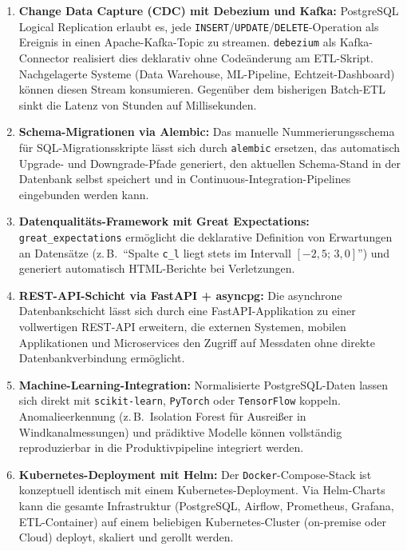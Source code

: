 \documentclass[12pt,a4paper]{report}
\theoremstyle{definition}
\theoremstyle{remark}
\newcommand{\docker}{\texttt{Docker}}
\newcommand{\code}[1]{\texttt{#1}}
\begin{document}
\begin{enumerate}[leftmargin=1.5em, itemsep=4pt]
  \item \textbf{Change Data Capture (CDC) mit Debezium und Kafka:}
        PostgreSQL Logical Replication erlaubt es, jede
        \code{INSERT}/\code{UPDATE}/\code{DELETE}-Operation als Ereignis
        in einen Apache-Kafka-Topic zu streamen. \code{debezium} als
        Kafka-Connector realisiert dies deklarativ ohne Codeänderung
        am ETL-Skript. Nachgelagerte Systeme (Data Warehouse,
        ML-Pipeline, Echtzeit-Dashboard) können diesen Stream
        konsumieren. Gegenüber dem bisherigen Batch-ETL sinkt die
        Latenz von Stunden auf Millisekunden.

  \item \textbf{Schema-Migrationen via Alembic:}
        Das manuelle Nummerierungsschema für SQL-Migrationsskripte
        lässt sich durch \code{alembic} ersetzen, das automatisch
        Upgrade- und Downgrade-Pfade generiert, den aktuellen
        Schema-Stand in der Datenbank selbst speichert und in
        Continuous-Integration-Pipelines eingebunden werden kann.

  \item \textbf{Datenqualitäts-Framework mit Great Expectations:}
        \code{great\_expectations} ermöglicht die deklarative Definition
        von Erwartungen an Datensätze (z.\,B.\ ``Spalte \code{c\_l}
        liegt stets im Intervall $[-2{,}5;\, 3{,}0]$'') und generiert
        automatisch HTML-Berichte bei Verletzungen.

  \item \textbf{REST-API-Schicht via FastAPI + asyncpg:}
        Die asynchrone Datenbankschicht lässt sich durch eine
        FastAPI-Applikation zu einer vollwertigen REST-API erweitern,
        die externen Systemen, mobilen Applikationen und Microservices
        den Zugriff auf Messdaten ohne direkte Datenbankverbindung
        ermöglicht.

  \item \textbf{Machine-Learning-Integration:}
        Normalisierte PostgreSQL-Daten lassen sich direkt mit
        \code{scikit-learn}, \code{PyTorch} oder \code{TensorFlow}
        koppeln. Anomalieerkennung (z.\,B.\ Isolation Forest für
        Ausreißer in Windkanalmessungen) und prädiktive Modelle
        können vollständig reproduzierbar in die Produktivpipeline
        integriert werden.

  \item \textbf{Kubernetes-Deployment mit Helm:}
        Der \docker-Compose-Stack ist konzeptuell identisch mit einem
        Kubernetes-Deployment. Via Helm-Charts kann die gesamte
        Infrastruktur (PostgreSQL, Airflow, Prometheus, Grafana,
        ETL-Container) auf einem beliebigen Kubernetes-Cluster
        (on-premise oder Cloud) deployt, skaliert und gerollt werden.
\end{enumerate}
\end{document}
